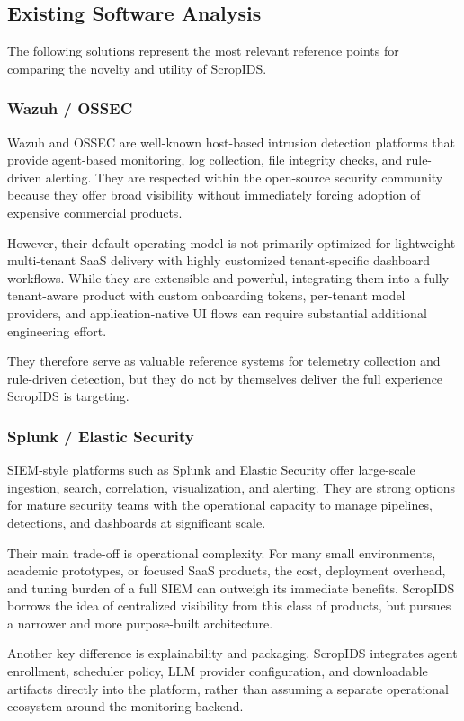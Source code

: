 \documentclass[12pt,a4paper]{article}
\begin{document}
\subsection{Existing Software Analysis}
The following solutions represent the most relevant reference points for comparing the novelty and utility of ScropIDS.

\subsubsection{Wazuh / OSSEC}
Wazuh and OSSEC are well-known host-based intrusion detection platforms that provide agent-based monitoring, log collection, file integrity checks, and rule-driven alerting. They are respected within the open-source security community because they offer broad visibility without immediately forcing adoption of expensive commercial products.

However, their default operating model is not primarily optimized for lightweight multi-tenant SaaS delivery with highly customized tenant-specific dashboard workflows. While they are extensible and powerful, integrating them into a fully tenant-aware product with custom onboarding tokens, per-tenant model providers, and application-native UI flows can require substantial additional engineering effort.

They therefore serve as valuable reference systems for telemetry collection and rule-driven detection, but they do not by themselves deliver the full experience ScropIDS is targeting.

\subsubsection{Splunk / Elastic Security}
SIEM-style platforms such as Splunk and Elastic Security offer large-scale ingestion, search, correlation, visualization, and alerting. They are strong options for mature security teams with the operational capacity to manage pipelines, detections, and dashboards at significant scale.

Their main trade-off is operational complexity. For many small environments, academic prototypes, or focused SaaS products, the cost, deployment overhead, and tuning burden of a full SIEM can outweigh its immediate benefits. ScropIDS borrows the idea of centralized visibility from this class of products, but pursues a narrower and more purpose-built architecture.

Another key difference is explainability and packaging. ScropIDS integrates agent enrollment, scheduler policy, LLM provider configuration, and downloadable artifacts directly into the platform, rather than assuming a separate operational ecosystem around the monitoring backend.
\end{document}
